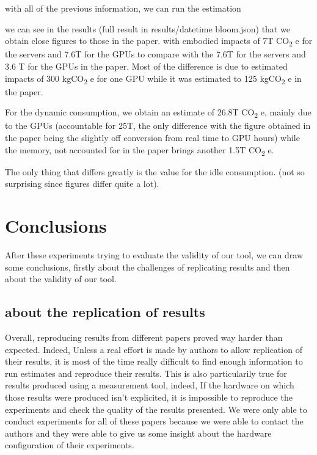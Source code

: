 \documentclass[11pt]{article}
\begin{document}
with all of the previous information, we can run the estimation

we can see in the results (full result in results/datetime bloom.json) that we obtain close figures to those in the
paper.
with embodied impacts of 7T CO\textsubscript{2} e for the servers and 7.6T for the
GPUs to compare with the 7.6T for the servers and 3.6 T for the GPUs
in the paper. Most of the difference is due to estimated impacts of
300 kgCO\textsubscript{2} e for one GPU while it was estimated to 125 kgCO\textsubscript{2} e in the
paper.

For the dynamic consumption, we obtain an estimate of 26.8T CO\textsubscript{2} e,
mainly due to the GPUs (accountable for 25T, the only difference with
the figure obtained in the paper being the slightly off conversion
from real time to GPU hours) while the memory, not accounted for in
the paper brings another 1.5T CO\textsubscript{2} e.

The only thing that differs greatly is the value for the idle
consumption. (not so surprising since figures differ quite a lot).


\section{Conclusions}
\label{sec:org74932ee}

After these experiments trying to evaluate the validity of our tool,
we can draw some conclusions, firstly about the challenges of
replicating results and then about the validity of our tool.

\subsection{about the replication of results}
\label{sec:org7383794}

Overall, reproducing results from different papers proved way harder
than expected. Indeed, Unless a real effort is made by authors to allow replication of
their results, it is most of the time really difficult to find
enough information to run estimates and reproduce their
results.
This is also particularily true for results produced
using a measurement tool, indeed, If the hardware on which those
results were produced isn't explicited, it is impossible to
reproduce the experiments and check the quality of the results
presented. We were only able to conduct experiments for all of these
papers because we were able to contact the authors and they were
able to give us some insight about the hardware configuration of their experiments.
\end{document}
